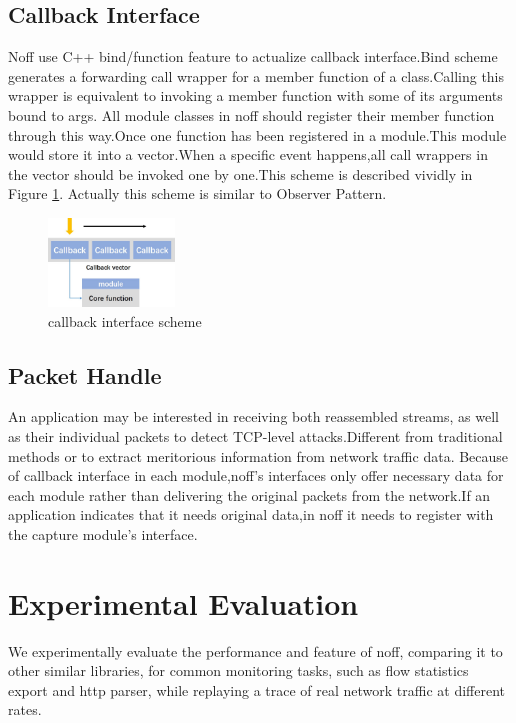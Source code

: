 \documentclass[conference]{IEEEtran}
\begin{document}
\subsection{Callback Interface}
Noff use C++ bind/function feature to actualize callback interface.Bind scheme generates a forwarding call wrapper for a member function of a class.Calling this wrapper is equivalent to invoking a member function with some of its arguments bound to args. 
All module classes in noff should register their member function through this way.Once one function has been registered in a module.This module would store it into a vector.When a specific event happens,all call wrappers in the vector should be invoked one by one.This scheme is described vividly in Figure \ref{fig:6}.
\newline\indent Actually this scheme is similar to Observer Pattern.
\begin{figure}[htbp]
  \centering
  \includegraphics[width=0.3\textwidth]{./picture/Figure5.jpg}
  \caption{callback interface scheme}
  \label{fig:6}
\end{figure}
\subsection{Packet Handle}
An application may be interested in receiving both reassembled streams, as well as their individual packets to detect TCP-level attacks.Different from traditional methods or to extract meritorious information from network traffic data. Because of callback interface in each module,noff's interfaces only offer necessary data for each module rather than delivering the original packets from the network.If an application indicates that it needs original data,in noff it needs to register with the capture module's interface.

\section{Experimental Evaluation}
We experimentally evaluate the performance and feature of noff, comparing it to other similar libraries, for common monitoring tasks, such as flow statistics export and http parser, while replaying a trace of real network traffic at different rates.
\end{document}
